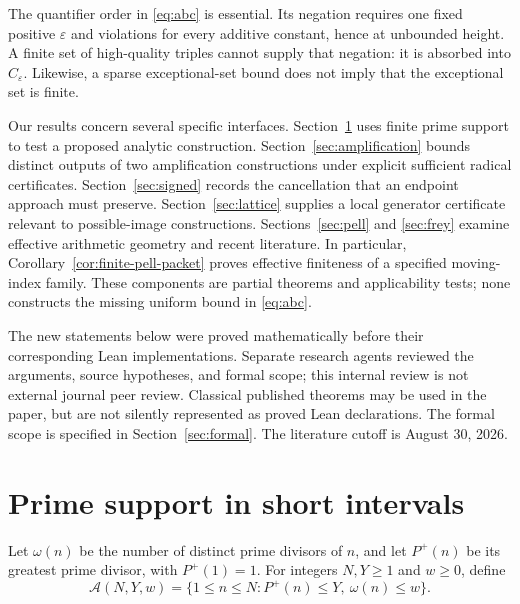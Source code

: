 \documentclass[11pt]{amsart}
\theoremstyle{definition}
\theoremstyle{remark}
\newcommand{\eps}{\varepsilon}
\begin{document}
The quantifier order in \eqref{eq:abc} is essential. Its negation requires
one fixed positive $\eps$ and violations for every additive constant, hence
at unbounded height. A finite set of high-quality triples cannot supply that
negation: it is absorbed into $C_\eps$. Likewise, a sparse exceptional-set
bound does not imply that the exceptional set is finite.

Our results concern several specific interfaces. Section~\ref{sec:smooth}
uses finite prime support to test a proposed analytic construction.
Section~\ref{sec:amplification} bounds distinct outputs of two amplification
constructions under explicit sufficient radical certificates.
Section~\ref{sec:signed} records the cancellation that an endpoint approach
must preserve. Section~\ref{sec:lattice} supplies a local generator
certificate relevant to possible-image constructions. Sections~\ref{sec:pell}
and \ref{sec:frey} examine effective arithmetic geometry and recent
literature. In particular, Corollary~\ref{cor:finite-pell-packet} proves
effective finiteness of a specified moving-index family. These components
are partial theorems and applicability tests; none
constructs the missing uniform bound in \eqref{eq:abc}.

The new statements below were proved mathematically before their
corresponding Lean implementations. Separate research agents reviewed the
arguments, source hypotheses, and formal scope; this internal review is
not external journal peer review. Classical published
theorems may be used in the paper, but are not silently represented as
proved Lean declarations. The formal scope is specified in
Section~\ref{sec:formal}. The literature cutoff is August 30, 2026.

\section{Prime support in short intervals}\label{sec:smooth}

Let $\omega(n)$ be the number of distinct prime divisors of $n$, and let
$P^+(n)$ be its greatest prime divisor, with $P^+(1)=1$.
For integers $N,Y\ge1$ and $w\ge0$, define
\[
 \mathcal A(N,Y,w)=
 \{1\le n\le N:P^+(n)\le Y,\ \omega(n)\le w\}.
\]
\end{document}
